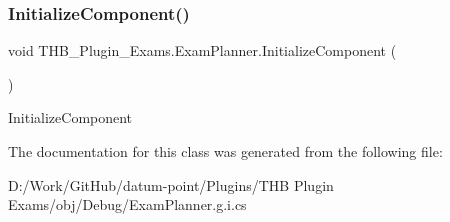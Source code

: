 \subsubsection{\texorpdfstring{Initialize\+Component()}{InitializeComponent()}\hspace{0.1cm}{\footnotesize\ttfamily [2/2]}}
{\footnotesize\ttfamily void T\+H\+B\+\_\+\+Plugin\+\_\+\+Exams.\+Exam\+Planner.\+Initialize\+Component (\begin{DoxyParamCaption}{ }\end{DoxyParamCaption})}



Initialize\+Component 



The documentation for this class was generated from the following file\+:\begin{DoxyCompactItemize}
\item 
D\+:/\+Work/\+Git\+Hub/datum-\/point/\+Plugins/\+T\+H\+B Plugin Exams/obj/\+Debug/Exam\+Planner.\+g.\+i.\+cs\end{DoxyCompactItemize}
